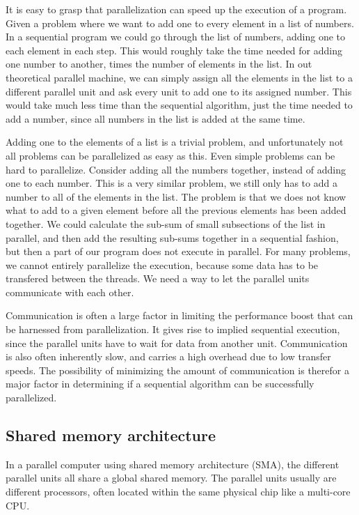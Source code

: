 It is easy to grasp that parallelization can speed up the execution of a program. Given a problem where we want to add one to every element in a list of numbers. In a sequential program we could go through the list of numbers, adding one to each element in each step. This would roughly take the time needed for adding one number to another, times the number of elements in the list. In out theoretical parallel machine, we can simply assign all the elements in the list to a different parallel unit and ask every unit to add one to its assigned number. This would take much less time than the sequential algorithm, just the time needed to add a number, since all numbers in the list is added at the same time.

Adding one to the elements of a list is a trivial problem, and unfortunately not all problems can be parallelized as easy as this. Even simple problems can be hard to parallelize. Consider adding all the numbers together, instead of adding one to each number. This is a very similar problem, we still only has to add a number to all of the elements in the list. The problem is that we does not know what to add to a given element before all the previous elements has been added together. We could calculate the sub-sum of small subsections of the list in parallel, and then add the resulting sub-sums together in a sequential fashion, but then a part of our program does not execute in parallel. For many problems, we cannot entirely parallelize the execution, because some data has to be transfered between the threads. We need a way to let the parallel units communicate with each other.

Communication is often a large factor in limiting the performance boost that can be harnessed from parallelization. It gives rise to implied sequential execution, since the parallel units have to wait for data from another unit. Communication is also often inherently slow, and carries a high overhead due to low transfer speeds. The possibility of minimizing the amount of communication is therefor a major factor in determining if a sequential algorithm can be successfully parallelized.

\subsection{Shared memory architecture} %
\label{sub:shared_memory_architecture}

In a parallel computer using shared memory architecture (SMA), the different parallel units all share a global shared memory. The parallel units usually are different processors, often located within the same physical chip like a multi-core CPU\@. 


